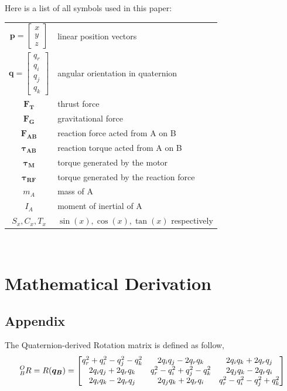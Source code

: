 Here is a list of all symbols used in this paper:
\\
\begin{tabular}{c p{}}
  $\bm{p} = \begin{bmatrix}x \\ y \\ z \end{bmatrix}$ & linear position vectors \\
  $\bm{q} = \begin{bmatrix} q_r \\ q_i \\ q_j \\ q_k \end{bmatrix}$ & angular orientation in quaternion \\
  $\bm{F_{T}}$ & thrust force \\
  $\bm{F_{G}}$ & gravitational force \\  
  $\bm{F_{AB}}$ & reaction force acted from A on B \\
  $\bm{\tau_{AB}}$ & reaction torque acted from A on B \\
  $\bm{\tau_{M}}$ & torque generated by the motor \\
  $\bm{\tau_{RF}}$ & torque generated by the reaction force \\  
  $m_A$ & mass of A \\
  $I_A$ & moment of inertial of A \\
  $S_x, C_x, T_x$ & $\sin(x), \cos(x), \tan(x)$ respectively \\
\end{tabular}\\

\section{Mathematical Derivation}
\subsection{Appendix}
The Quaternion-derived Rotation matrix is defined as follow,
\begin{align*}
  \prescript{O}{B}{R} = R(\bm{q_B}) =
  \begin{bmatrix}
    q_r^2 + q_i^2 - q_j^2 - q_k^2 & 2q_iq_j - 2q_rq_k & 2q_iq_k + 2q_rq_j \\
    2q_iq_j + 2q_rq_k & q_r^2 - q_i^2 + q_j^2 - q_k^2 & 2q_jq_k - 2q_rq_i \\
    2q_iq_k - 2q_rq_j & 2q_jq_k + 2q_rq_i & q_r^2 - q_i^2 - q_j^2 +q_k^2
  \end{bmatrix}
\end{align*}

